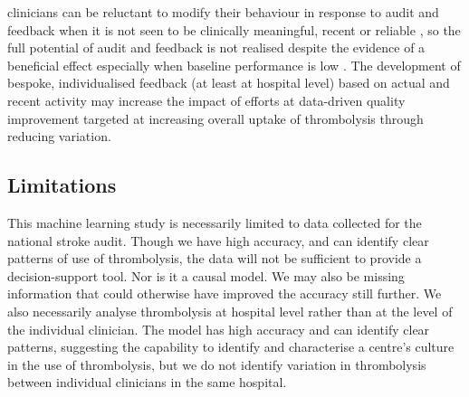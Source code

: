 clinicians can be reluctant to modify their behaviour in response to audit and feedback when it is not seen to be clinically meaningful, recent or reliable \cite{bekker_give_2022}, so the full potential of audit and feedback is not realised \cite{foy_revitalising_2020} despite the evidence of a beneficial effect especially when baseline performance is low \cite{ivers_audit_2012}. The development of bespoke, individualised feedback (at least at hospital level) based on actual and recent activity may increase the impact of efforts at data-driven quality improvement targeted at increasing overall uptake of thrombolysis through reducing variation.



\subsection{Limitations}

This machine learning study is necessarily limited to data collected for the national stroke audit. Though we have high accuracy, and can identify clear patterns of use of thrombolysis, the data will not be sufficient to provide a decision-support tool. Nor is it a causal model. We may also be missing information that could otherwise have improved the accuracy still further. We also necessarily analyse thrombolysis at hospital level rather than at the level of the individual clinician. The model has high accuracy and can identify clear patterns, suggesting the capability to identify and characterise a centre's culture in the use of thrombolysis, but we do not identify variation in thrombolysis between individual clinicians in the same hospital.

